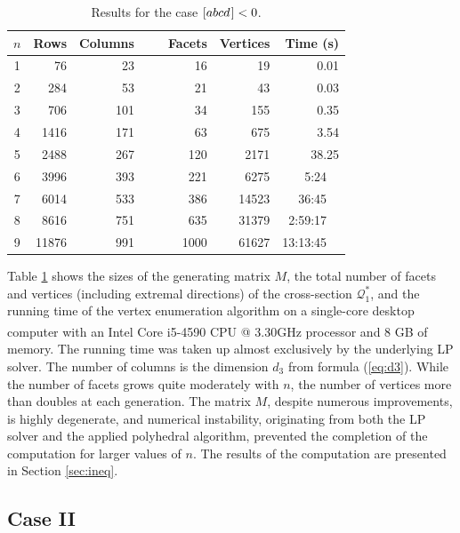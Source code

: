 \documentclass[reqno]{amsart}
\theoremstyle{definition}
\newcommand\tsp{\mkern 1.5mu}
\def\abcd{[abcd\tsp]}
\begin{document}
\begin{table}[h!bt]
\def\bb{\kern -5pt}
\begin{tabular}{crrrrr}
$n$ & Rows & Columns\bb & ~~~Facets\bb & Vertices\bb & Time (s)\bb  \\
\hline
\rule{0pt}{11pt}%
1   & 76   &  23     &  16    &    19    &   0.01 \\
2   & 284  &  53     &  21    &    43    &   0.03 \\
3   & 706  & 101     &  34    &   155    &   0.35 \\
4   & 1416 & 171     &  63    &   675    &   3.54 \\
5   & 2488 & 267     & 120    &  2171    &  38.25 \\
6   & 3996 & 393     & 221    &  6275    &   5:24~\;~{\space} \\
7   & 6014 & 533     & 386    & 14523    &  36:45~\;~{\space} \\
8   & 8616 & 751     & 635    & 31379    & 2:59:17~\;~{\space} \\
9   & 11876 & 991    & 1000   & 61627    & 13:13:45~\;~{\space} \\
\hline
\end{tabular}

\vskip 5pt

\caption{Results for the case $\abcd<0$.}\label{table:2}%
\end{table}

Table \ref{table:2} shows the sizes of the generating matrix $M$, the total
number of facets and vertices (including extremal directions) of the
cross-section $\mathcal Q^*_1$, and the running time of the vertex
enumeration algorithm on a single-core desktop computer with an
Intel\textsuperscript{\textregistered} Core{\texttrademark} i5-4590 CPU @
3.30GHz processor and 8 GB of memory. The running time was taken up almost
exclusively by the underlying LP solver. The number of columns is the
dimension $d_3$ from formula (\ref{eq:d3}). While the number of facets grows
quite moderately with $n$, the number of vertices more than doubles at each
generation. The matrix $M$, despite numerous improvements, is highly
degenerate, and numerical instability, originating from both the LP solver
and the applied polyhedral algorithm, prevented the completion of the
computation for larger values of $n$. The results of the computation are
presented in Section \ref{sec:ineq}.

\subsection{Case II}
\end{document}

